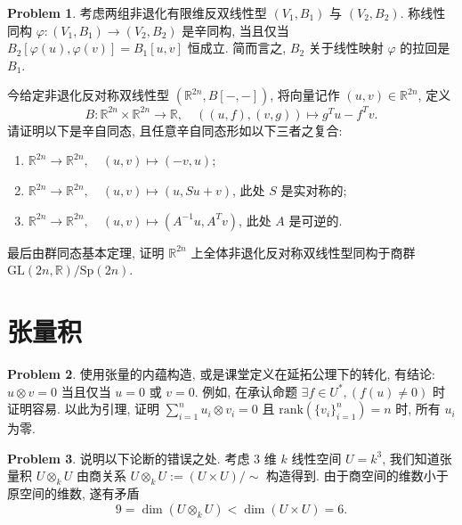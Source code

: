 \documentclass{MainStyle}
\theoremstyle{definition}
\newtheorem{problem}{Problem}
\begin{document}
\begin{problem}
考虑两组非退化有限维反双线性型 $(V_1,B_1)$ 与 $(V_2,B_2)$. 称线性同构 $\varphi : (V_1,B_1)\to (V_2,B_2)$ 是辛同构, 当且仅当 $B_2[\varphi(u),\varphi(v)]=B_1[u,v]$ 恒成立. 简而言之, $B_2$ 关于线性映射 $\varphi$ 的拉回是 $B_1$.

今给定非退化反对称双线性型 $(\mathbb R^{2n}, B[-,-])$, 将向量记作 $(u,v)\in \mathbb R^{2n}$, 定义
\begin{equation}
    B:\mathbb R^{2n}\times\mathbb R^{2n}\to \mathbb R,\quad ((u,f),(v,g))\mapsto g^Tu-f^Tv.
\end{equation}
请证明以下是辛自同态, 且任意辛自同态形如以下三者之复合:
\begin{enumerate}
    \item $\mathbb R^{2n}\to \mathbb R^{2n},\quad (u,v)\mapsto (-v,u)$;
    \item $\mathbb R^{2n}\to \mathbb R^{2n},\quad (u,v)\mapsto (u,Su+v)$, 此处 $S$ 是实对称的;
    \item $\mathbb R^{2n}\to \mathbb R^{2n},\quad (u,v)\mapsto (A^{-1}u,A^Tv)$, 此处 $A$ 是可逆的.
\end{enumerate}
最后由群同态基本定理, 证明 $\mathbb R^{2n}$ 上全体非退化反对称双线性型同构于商群 $\mathrm{GL}(2n,\mathbb R)/\mathrm{Sp}(2n)$.
\end{problem}

\newpage

\section{张量积}

\begin{problem}
使用张量的内蕴构造, 或是课堂定义在延拓公理下的转化, 有结论: $u\otimes v=0$ 当且仅当 $u=0$ 或 $v=0$. 例如, 在承认命题 $\exists f\in U^\ast, (f(u)\neq 0)$ 时证明容易. 以此为引理, 证明 $\sum_{i=1}^nu_i\otimes v_i=0$ 且 $\mathrm{rank}(\{v_i\}_{i=1}^n)=n$ 时, 所有 $u_i$ 为零.
\end{problem}

\begin{problem}
说明以下论断的错误之处. 考虑 $3$ 维 $k$ 线性空间 $U=k^3$, 我们知道张量积 $U\otimes_k U$ 由商关系 $U\otimes _k U:=(U\times U)/ \sim$ 构造得到. 由于商空间的维数小于原空间的维数, 遂有矛盾
\begin{equation}
    9=\dim (U\otimes_k U)<\dim (U\times U)=6.
\end{equation}
\end{problem}
\end{document}

